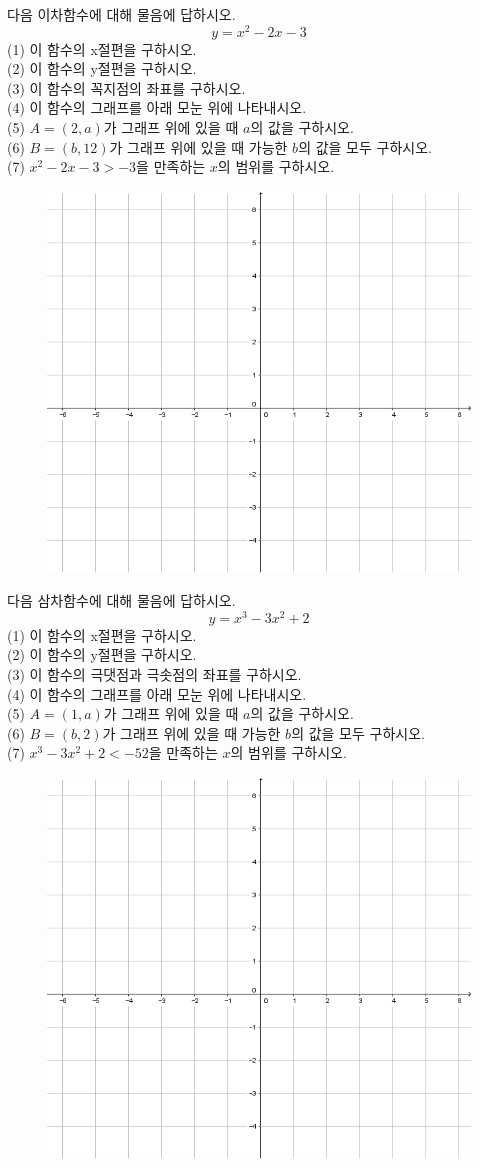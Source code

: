 \documentclass{article}
\newcommand\bp[1]{\begin{mdframed}[frametitle={#1},skipabove=10pt,skipbelow=20pt,innertopmargin=5pt,innerbottommargin=40pt]}
\newcommand\ep{\end{mdframed}\par}
\newcommand{\vvs}{\vspace{0.1\textheight}}
\begin{document}
\bp{06}
다음 이차함수에 대해 물음에 답하시오.
\[y=x^2-2x-3\]
(1) 이 함수의 x절편을 구하시오.\\
(2) 이 함수의 y절편을 구하시오.\\
(3) 이 함수의 꼭지점의 좌표를 구하시오.\\
(4) 이 함수의 그래프를 아래 모눈 위에 나타내시오.\\
(5) \(A=(2,a)\)가 그래프 위에 있을 때 \(a\)의 값을 구하시오.\\
(6) \(B=(b,12)\)가 그래프 위에 있을 때 가능한 \(b\)의 값을 모두 구하시오.\\
(7) \(x^2-2x-3>-3\)을 만족하는 \(x\)의 범위를 구하시오.
\vvs\ep
\begin{figure}[h!]
\centering
\includegraphics[width=.7\textwidth]{grid}
\end{figure}

\bp{07}
다음 삼차함수에 대해 물음에 답하시오.
\[y=x^3-3x^2+2\]
(1) 이 함수의 x절편을 구하시오.\\
(2) 이 함수의 y절편을 구하시오.\\
(3) 이 함수의 극댓점과 극솟점의 좌표를 구하시오.\\
(4) 이 함수의 그래프를 아래 모눈 위에 나타내시오.\\
(5) \(A=(1,a)\)가 그래프 위에 있을 때 \(a\)의 값을 구하시오.\\
(6) \(B=(b,2)\)가 그래프 위에 있을 때 가능한 \(b\)의 값을 모두 구하시오.\\
(7) \(x^3-3x^2+2<-52\)을 만족하는 \(x\)의 범위를 구하시오.
\vvs\ep
\begin{figure}[h!]
\centering
\includegraphics[width=.7\textwidth]{grid}
\end{figure}
\end{document}
